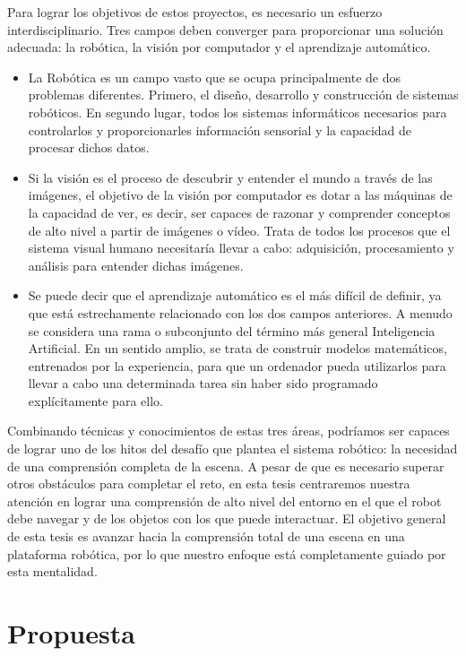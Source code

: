 Para lograr los objetivos de estos proyectos, es necesario un esfuerzo interdisciplinario. Tres campos deben converger para proporcionar una solución adecuada: la robótica, la visión por computador y el aprendizaje automático.

\begin{itemize}
	\item La Robótica es un campo vasto que se ocupa principalmente de dos problemas diferentes. Primero, el diseño, desarrollo y construcción de sistemas robóticos. En segundo lugar, todos los sistemas informáticos necesarios para controlarlos y proporcionarles información sensorial y la capacidad de procesar dichos datos.

	\item Si la visión es el proceso de descubrir y entender el mundo a través de las imágenes, el objetivo de la visión por computador es dotar a las máquinas de la capacidad de ver, es decir, ser capaces de razonar y comprender conceptos de alto nivel a partir de imágenes o vídeo. Trata de todos los procesos que el sistema visual humano necesitaría llevar a cabo: adquisición, procesamiento y análisis para entender dichas imágenes.

	\item Se puede decir que el aprendizaje automático es el más difícil de definir, ya que está estrechamente relacionado con los dos campos anteriores. A menudo se considera una rama o subconjunto del término más general Inteligencia Artificial. En un sentido amplio, se trata de construir modelos matemáticos, entrenados por la experiencia, para que un ordenador pueda utilizarlos para llevar a cabo una determinada tarea sin haber sido programado explícitamente para ello.
\end{itemize}

Combinando técnicas y conocimientos de estas tres áreas, podríamos ser capaces de lograr uno de los hitos del desafío que plantea el sistema robótico: la necesidad de una comprensión completa de la escena. A pesar de que es necesario superar otros obstáculos para completar el reto, en esta tesis centraremos nuestra atención en lograr una comprensión de alto nivel del entorno en el que el robot debe navegar y de los objetos con los que puede interactuar. El objetivo general de esta tesis es avanzar hacia la comprensión total de una escena en una plataforma robótica, por lo que nuestro enfoque está completamente guiado por esta mentalidad.

\section{Propuesta}

